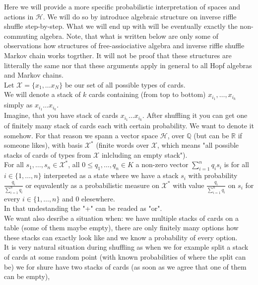 \documentclass[a4paper, 12pt]{report}
\begin{document}
Here we will provide a more specific probabilistic interpretation of spaces and actions in $\mathcal{H}$.
We will do so by introduce algebraic structure on inverse riffle shuffle step-by-step. What we will end 
up with will be eventually exactly the non-commuting algebra. Note, that what is written below are only 
some of observations how structures of free-assiociative algebra and inverse riffle shuffle Markov chain 
works togrther. It will not be proof that these structures are litterally the same nor that these arguments 
apply  in general to all Hopf algebras and Markov chains.\\[4pt]

Let $\mathcal{X} = \{x_1, \dots x_N\}$ be our set of all possible types of cards. \\
We will denote a stack of $k$ cards containing (from top to bottom) $x_{i_1}, \dots, x_{i_k}$ simply as 
$x_{i_1}\dots x_{i_k}$. \\
Imagine, that you have stack of cards $x_{i_1}\dots x_{i_k}$. After shuffling it
you can get one of finitely many stack of cards each with certain probability. We want to denote it somehow. 
For that reason we spann a vector space $\mathcal{H}$, over $\mathbb{Q}$ (but can be $\mathbb{R}$ if someone 
likes), 
with basis $\mathcal{X}^*$ (finite words over $\mathcal{X}$, which means "all possible stacks 
of cards of types from $\mathcal{X}$ inlcluding an empty stack"). \\
For all $s_1, \dots, s_n \in \mathcal{X}^*$, all $0 \leq q_1, \dots, q_n \in K$ a non-zero vector 
$\displaystyle\sum^{n}_{i = 1} q_is_i$ is for all $i \in \{1, \dots, n\}$ 
interpreted as a state where we have a stack $s_i$ with probability $\frac{q_i}{\sum^n_{i=1} q_i}$ or 
equvalently as a probabilistic measure on $\mathcal{X}^*$ with value $\frac{q_i}{\sum^n_{i=1} q_i}$ on $s_i$ 
for every $i \in \{1, \dots, n\}$ and $0$ elesewhere. \\
In that undestanding the "+" can be readed as "or". \\
We want also desribe a situation when: we have multiple stacks of cards on a table (some of them maybe 
empty), there are only finitely many options how 
these stacks can exactly look like and we know a probability of every option.\\ 
It is very natural situation during shuffling as when we for example split a stack of cards at some 
random point (with known probabilities of where the split can be) 
we for shure have two stacks of cards (as soon as we agree that one of them can be empty), 
\end{document}
